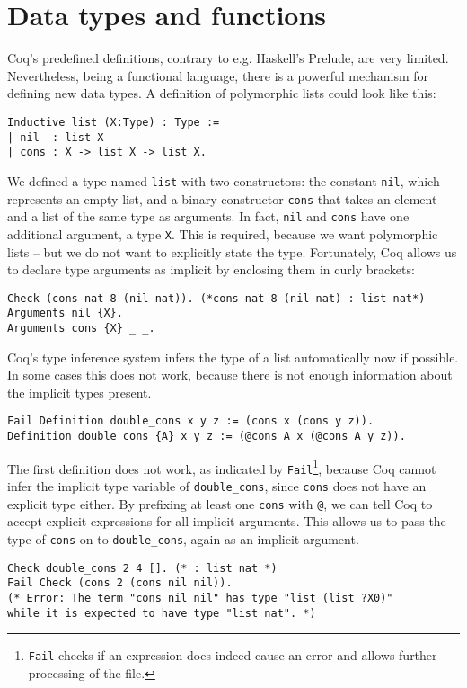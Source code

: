 \documentclass[fleqn]{scrreprt}
\newcommand{\coqinline}[1]{\texttt{#1}}
\begin{document}
\section{Data types and functions}
Coq's predefined definitions, contrary to e.g. Haskell's Prelude, are very limited. Nevertheless, being a functional language, there is a powerful mechanism for defining new data types. A definition of polymorphic lists could look like this:
\begin{verbatim}
Inductive list (X:Type) : Type :=
| nil  : list X
| cons : X -> list X -> list X.
\end{verbatim}
We defined a type named \coqinline{list} with two constructors: the constant \coqinline{nil}, which represents an empty list, and a binary constructor \coqinline{cons} that takes an element and a list of the same type as arguments. In fact, \coqinline{nil} and \coqinline{cons} have one additional argument, a type \coqinline{X}. This is required, because we want polymorphic lists -- but we do not want to explicitly state the type. Fortunately, Coq allows us to declare type arguments as implicit by enclosing them in curly brackets:
\begin{verbatim}
Check (cons nat 8 (nil nat)). (*cons nat 8 (nil nat) : list nat*)
Arguments nil {X}.
Arguments cons {X} _ _.
\end{verbatim}
Coq's type inference system infers the type of a list automatically now if possible. In some cases this does not work, because there is not enough information about the implicit types present. 
\begin{verbatim}
Fail Definition double_cons x y z := (cons x (cons y z)).
Definition double_cons {A} x y z := (@cons A x (@cons A y z)).
\end{verbatim}
The first definition does not work, as indicated by \coqinline{Fail}\footnote{\coqinline{Fail} checks if an expression does indeed cause an error and allows further processing of the file.}, because Coq cannot infer the implicit type variable of \coqinline{double_cons}, since \coqinline{cons} does not have an explicit type either. By prefixing at least one \coqinline{cons} with \coqinline{@}, we can tell Coq to accept explicit expressions for all implicit arguments. This allows us to pass the type of \coqinline{cons} on to \coqinline{double_cons}, again as an implicit argument.
\begin{verbatim}
Check double_cons 2 4 []. (* : list nat *)
Fail Check (cons 2 (cons nil nil)). 
(* Error: The term "cons nil nil" has type "list (list ?X0)"
while it is expected to have type "list nat". *)
\end{verbatim}
\end{document}
